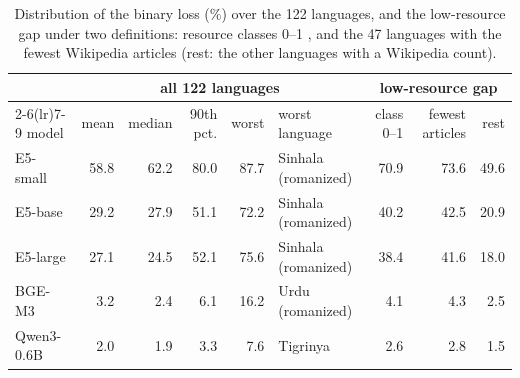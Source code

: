 \begin{table}[t]\centering\footnotesize
\begin{tabular}{lrrrrlrrr}
\toprule
 & \multicolumn{5}{c}{all 122 languages} & \multicolumn{3}{c}{low-resource gap} \\
\cmidrule(lr){2-6}\cmidrule(lr){7-9}
model & mean & median & 90th pct. & worst & worst language & class 0--1 & fewest articles & rest \\
\midrule
E5-small & 58.8 & 62.2 & 80.0 & 87.7 & Sinhala (romanized) & 70.9 & 73.6 & 49.6 \\
E5-base & 29.2 & 27.9 & 51.1 & 72.2 & Sinhala (romanized) & 40.2 & 42.5 & 20.9 \\
E5-large & 27.1 & 24.5 & 52.1 & 75.6 & Sinhala (romanized) & 38.4 & 41.6 & 18.0 \\
BGE-M3 & 3.2 & 2.4 & 6.1 & 16.2 & Urdu (romanized) & 4.1 & 4.3 & 2.5 \\
Qwen3-0.6B & 2.0 & 1.9 & 3.3 & 7.6 & Tigrinya & 2.6 & 2.8 & 1.5 \\
\bottomrule
\end{tabular}
\caption{Distribution of the binary loss (\%) over the 122 languages, and the low-resource gap under two definitions: resource classes 0--1 \citep{joshi2020state}, and the 47 languages with the fewest Wikipedia articles (rest: the other languages with a Wikipedia count).}\label{tab:dist}
\end{table}
